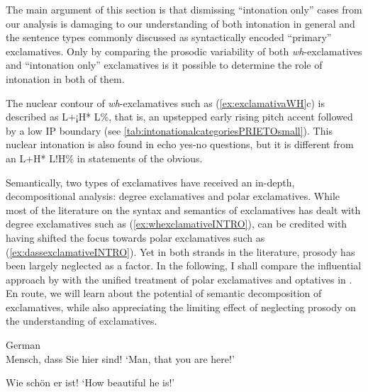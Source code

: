 The main argument of this section is that dismissing ``intonation only'' 
cases from our analysis is damaging to our understanding of both intonation 
in general and the sentence types commonly discussed as syntactically 
encoded ``primary'' exclamatives. Only by comparing the prosodic 
variability of both \textit{wh}-exclamatives and ``intonation only'' exclamatives is it possible to determine the role of intonation in both of them.

The nuclear contour of \textit{wh}-exclamatives such as 
(\ref{ex:exclamativaWH}c) is described as L$+$¡H* L\%, that is, an 
upstepped early rising pitch 
accent followed by a low \ac{IP} boundary (see \autoref{tab:intonationalcategoriesPRIETOsmall}). This nuclear intonation is 
also found in echo yes-no questions, but it is different from an L$+$H* 
L!H\% in statements of the obvious. 

Semantically, two types of exclamatives have received an in-depth, decompositional analysis: degree exclamatives and polar exclamatives. While most of the literature on the syntax and semantics of exclamatives has dealt with degree exclamatives such as (\ref{ex:whexclamativeINTRO}), \citet{Grosz.2012} can be credited with having shifted the focus towards polar exclamatives such as (\ref{ex:dassexclamativeINTRO}). Yet in both strands in the literature, prosody has been largely neglected as a factor. In the following, I shall compare the influential approach by \citet{ZanuttiniPortner2003} with the unified treatment of polar exclamatives and optatives in \citet{Grosz.2012}. En route, we will learn about the potential of semantic decomposition of exclamatives, while also appreciating the limiting effect of neglecting prosody on the understanding of exclamatives.

\begin{exe}
	\ex German\label{ex:dassexclamativeINTRO}\\ Mensch, dass Sie hier sind!
	\glt `Man, that you are here!'
	
	\ex \label{ex:whexclamativeINTRO} Wie schön er ist!
	\glt `How beautiful he is!' 
\end{exe}


